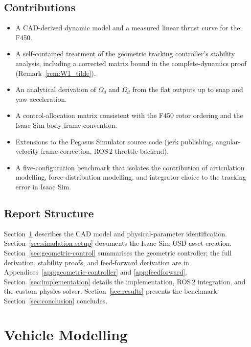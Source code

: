 \documentclass[11pt]{article}
\theoremstyle{remark}
\begin{document}
\subsection{Contributions}
\begin{itemize}
    \item A CAD-derived dynamic model and a measured linear thrust curve for the F450.
    \item A self-contained treatment of the geometric tracking controller's stability analysis, including a corrected matrix bound in the complete-dynamics proof (Remark~\ref{rem:W1_tilde}).
    \item An analytical derivation of $\Omega_d$ and $\dot\Omega_d$ from the flat outputs up to snap and yaw acceleration.
    \item A control-allocation matrix consistent with the F450 rotor ordering and the Isaac Sim body-frame convention.
    \item Extensions to the Pegasus Simulator source code (jerk publishing, angular-velocity frame correction, ROS\,2 throttle backend).
    \item A five-configuration benchmark that isolates the contribution of articulation modelling, force-distribution modelling, and integrator choice to the tracking error in Isaac Sim.
\end{itemize}

\subsection{Report Structure}
Section~\ref{sec:vehicle-modelling} describes the CAD model and physical-parameter identification. Section~\ref{sec:simulation-setup} documents the Isaac Sim USD asset creation. Section~\ref{sec:geometric-control} summarises the geometric controller; the full derivation, stability proofs, and feed-forward derivation are in Appendices~\ref{app:geometric-controller} and \ref{app:feedforward}. Section~\ref{sec:implementation} details the implementation, ROS\,2 integration, and the custom physics solver. Section~\ref{sec:results} presents the benchmark. Section~\ref{sec:conclusion} concludes.

\section{Vehicle Modelling}
\label{sec:vehicle-modelling}
\end{document}
